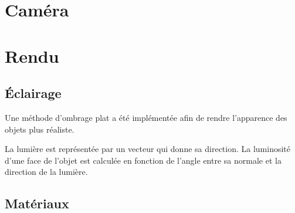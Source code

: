 \newpage
{}

\section{Caméra}

\section{Rendu}

    \subsection{Éclairage}

    Une méthode d'ombrage plat a été implémentée afin de rendre l'apparence des objets plus réaliste.

    La lumière est représentée par un vecteur qui donne sa direction. La luminosité d'une face de l'objet est calculée en fonction de l'angle entre sa normale et la direction de la lumière.

    \subsection{Matériaux}
